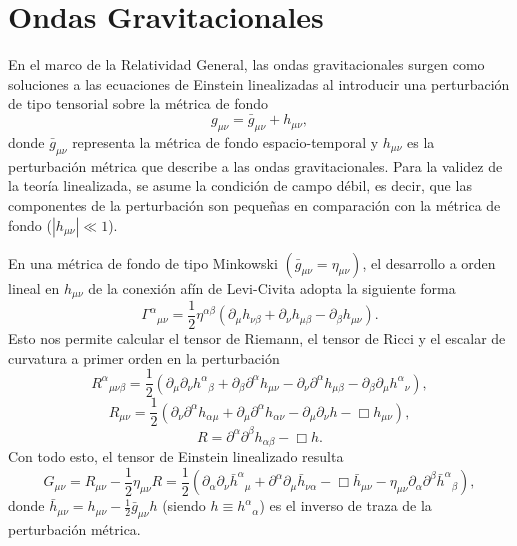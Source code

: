 \chapter{Ondas Gravitacionales} \label{sec:cap2}

En el marco de la Relatividad General, las ondas gravitacionales surgen como soluciones a las ecuaciones de Einstein linealizadas al introducir una perturbación de tipo tensorial sobre la métrica de fondo \cite{Caprini_2020, Maggiore_2018}
\begin{equation}
    g_{\mu\nu} = \bar{g}_{\mu\nu} + h_{\mu\nu},
\end{equation}
donde $\bar{g}_{\mu\nu}$ representa la métrica de fondo espacio-temporal y $h_{\mu\nu}$ es la perturbación métrica que describe a las ondas gravitacionales. Para la validez de la teoría linealizada, se asume la condición de campo débil, es decir, que las componentes de la perturbación son pequeñas en comparación con la métrica de fondo ($\left| h_{\mu\nu} \right| \ll 1$).

En una métrica de fondo de tipo Minkowski $(\bar{g}_{\mu\nu} = \eta_{\mu\nu})$, el desarrollo a orden lineal en $h_{\mu\nu}$ de la conexión afín de Levi-Civita adopta la siguiente forma
\begin{equation}
    {\Gamma^{\alpha}}_{\mu\nu} = \frac{1}{2} \eta^{\alpha \beta} \left( \partial_\mu h_{\nu\beta} + \partial_\nu h_{\mu \beta} - \partial_\beta h_{\mu \nu} \right).
\end{equation}
Esto nos permite calcular el tensor de Riemann, el tensor de Ricci y el escalar de curvatura a primer orden en la perturbación
\begin{equation}
    {R^\alpha}_{\mu\nu\beta} = \frac{1}{2} \left( \partial_\mu \partial_\nu {h^\alpha}_\beta + \partial_\beta \partial^\alpha h_{\mu\nu} - \partial_\nu \partial^\alpha h_{\mu \beta} - \partial_\beta \partial_\mu {h^\alpha}_\nu \right),
\end{equation}
\begin{equation}
    R_{\mu\nu} = \frac{1}{2} \left( \partial_\nu \partial^\alpha h_{\alpha \mu} + \partial_\mu \partial^\alpha h_{\alpha \nu} - \partial_\mu \partial_\nu h - \Box h_{\mu\nu} \right),
\end{equation}
\begin{equation}
    R = \partial^\alpha \partial^\beta h_{\alpha \beta} - \Box h.
\end{equation}
Con todo esto, el tensor de Einstein linealizado resulta
\begin{equation}\label{eqn:Guv}
    G_{\mu\nu} = R_{\mu\nu} - \frac{1}{2} \eta_{\mu\nu} R = \frac{1}{2} \left( \partial_\alpha \partial_\nu {\bar{h}^\alpha}_\mu + \partial^\alpha \partial_\mu \bar{h}_{\nu \alpha} - \Box \bar{h}_{\mu\nu} - \eta_{\mu\nu} \partial_\alpha \partial^\beta {\bar{h}^\alpha}_\beta \right),
\end{equation}
donde $\displaystyle \bar{h}_{\mu\nu} = h_{\mu\nu} - \frac{1}{2} \bar{g}_{\mu \nu} h$ (siendo $h \equiv {h^\alpha}_\alpha$) es el inverso de traza de la perturbación métrica.

